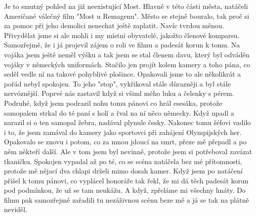 
Je to smutný pohled na již neexistující Most. Hlavně v této části
města, natáčeli Američané válečný film "Most u Remagenu". Město se
stejně bouralo, tak proč si za pomoc při jeho demolici nenechat ještě
zaplatit. Navíc tvrdou měnou. Přivydělat jsme si ale mohli i my místní
obyvatelé, jakožto členové komparsu. Samozřejmě, že i já projevil
zájem o roli ve filmu a padesát korun k tomu. Na vojáka jsem ještě
neměl výšku a tak jsem se stal členem davu, který byl odváděn vojáky v
německých uniformách. Stačilo jen projít kolem kamery a toho pána, co
seděl vedle ní na takové pohyblivé plošince. Opakovali jsme to ale
několikrát a pořád nebyl spokojen. To jeho "stop", vykřikoval stále
důrazněji a byl stále nervóznější. Poprvé nás zastavil když si všiml
mého luku a čelenky s pérem. Podruhé, když jsem podrazil nohu tomu
pánovi co hrál esesáka, protože samopalem strkal do té paní s holí a
řval na ní něco německy. Když upadl a narazil si o ten samopal žebra,
nadával plynule česky. Nakonec tomu šéfovi vadilo i to, že jsem
zamával do kamery jako sportovci při zahájení Olympijských her.
Opakovalo se znovu i potom, co za mnou jdoucí na smrt, přeze mě
přepadl a po něm někteří další. Ale v tom jsem byl nevinně, protože
jsem si potřeboval zavázat tkaničku. Spokojen vypadal až po té, co se
scéna natáčela bez mé přítomnosti, protože mě nějací dva chlapi drželi
mimo dosah kamer. Když jsem po natáčení přišel k tomu pánovi, co
vyplácel honoráře tak řekl, že mi dá těch padesát korun pod podmínkou,
že už se tam neukážu. A když, zpřeláme mi všechny hnáty. Do filmu pak
samozřejmě zařadili tu nezáživnou scénu beze mě a já se tak na plátně
neviděl.

